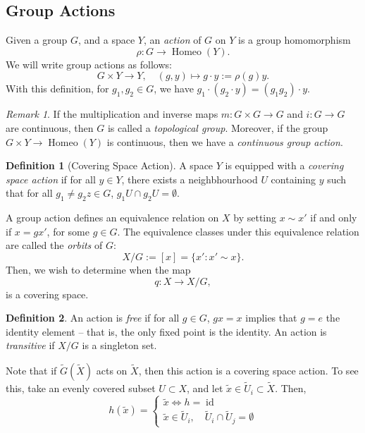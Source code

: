 \documentclass[a4paper]{report}
\theoremstyle{definition}
\newtheorem{definition}{Definition}
\theoremstyle{remark}
\newtheorem{remark}{Remark}
\theoremstyle{proposition}
\theoremstyle{conjecture}
\theoremstyle{lemma}
\theoremstyle{corollary}
\theoremstyle{exercise}
\newcommand{\on}{\operatorname}
\begin{document}
\subsection{Group Actions}

Given a group $G$, and a space $Y$, an \emph{action} of $G$ on $Y$ is a group homomorphism 
$$\rho : G \longrightarrow \on{Homeo}(Y).$$
We will write group actions as follows: 
$$ G \times Y \longrightarrow Y,\quad (g,y) \longmapsto g \cdot y := \rho(g)y.$$
With this definition, for $g_1, g_2 \in G$, we have $g_1 \cdot (g_2\cdot y) = (g_1g_2)\cdot y$.

\begin{remark}
    If the multiplication and inverse maps $m : G \times G \to G$ and 
    $i : G \to G$ are continuous, then $G$ is called a \emph{topological group}.
    Moreover, if the group $G \times Y \to \on{Homeo}(Y)$ is continuous, then we have a 
    \emph{continuous group action}.
\end{remark}

\begin{definition}[Covering Space Action]
    A space $Y$ is equipped with a \emph{covering space action} if
    for all $y\in Y$, there exists a neighbhourhood $U$ containing $y$ such that 
    for all $g_1 \neq g_2 z \in G$, $g_1U \cap g_2U = \emptyset$.
\end{definition}

A group action defines an equivalence relation on $X$ by setting $x\sim x'$ if and only if 
$x = gx'$, for some $g\in G$. The equivalence classes under this equivalence relation are called 
the \emph{orbits} of $G$: 
$$X/G := [x] = \lbrace x' : x' \sim x\rbrace.$$ 
Then, we wish to determine when the map 
$$q : X \longrightarrow X/G,$$ is a covering space. 

\begin{definition}
    An action is \emph{free} if for all $g \in G$, $gx = x$ implies that $g =e$
    the identity element -- that is, the only fixed point is the identity.
    An action is \emph{transitive} if $X/G$ is a singleton set.
\end{definition}

Note that if $\widetilde{G}(\widetilde{X})$ acts on $\widetilde{X}$, then this action
is a covering space action.
To see this, take an evenly covered subset $U\subset X$, and let 
$\widetilde{x} \in \widetilde{U}_i \subset \widetilde{X}$. Then, 
$$h(\widetilde{x}) = \begin{cases}
    \widetilde{x} \Longleftrightarrow h = \on{id}\\ 
    \widetilde{x} \in \widetilde{U}_i, \quad \widetilde{U}_i \cap \widetilde{U}_j = \emptyset
\end{cases}$$
\end{document}
